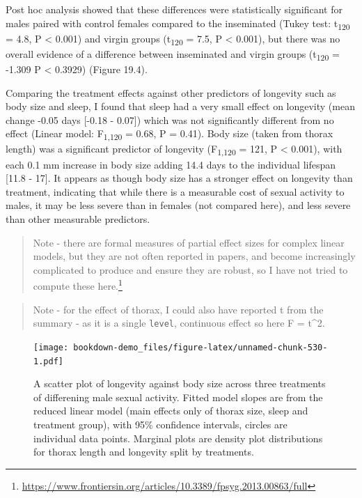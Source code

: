 \documentclass[
]{book}
\begin{document}
Post hoc analysis showed that these differences were statistically significant for males paired with control females compared to the inseminated (Tukey test: t\textsubscript{120} = 4.8, P \textless{} 0.001) and virgin groups (t\textsubscript{120} = 7.5, P \textless{} 0.001), but there was no overall evidence of a difference between inseminated and virgin groups (t\textsubscript{120} = -1.309 P \textless{} 0.3929) (Figure 19.4).

Comparing the treatment effects against other predictors of longevity such as body size and sleep, I found that sleep had a very small effect on longevity (mean change -0.05 days {[}-0.18 - 0.07{]}) which was not significantly different from no effect (Linear model: F\textsubscript{1,120} = 0.68, P = 0.41). Body size (taken from thorax length) was a significant predictor of longevity (F\textsubscript{1,120} = 121, P \textless{} 0.001), with each 0.1 mm increase in body size adding 14.4 days to the individual lifespan {[}11.8 - 17{]}. It appears as though body size has a stronger effect on longevity than treatment, indicating that while there is a measurable cost of sexual activity to males, it may be less severe than in females (not compared here), and less severe than other measurable predictors.

\begin{quote}
Note - there are formal measures of partial effect sizes for complex linear models, but they are not often reported in papers, and become increasingly complicated to produce and ensure they are robust, so I have not tried to compute these here.\footnote{\url{https://www.frontiersin.org/articles/10.3389/fpsyg.2013.00863/full}}
\end{quote}

\begin{quote}
Note - for the effect of thorax, I could also have reported t from the summary - as it is a single \texttt{level}, continuous effect so here F = t\^{}2.
\end{quote}

\begin{figure}
\centering
\texttt{[image: bookdown-demo\_files/figure-latex/unnamed-chunk-530-1.pdf]}
\caption{\label{fig:unnamed-chunk-530} A scatter plot of longevity against body size across three treatments of differening male sexual activity. Fitted model slopes are from the reduced linear model (main effects only of thorax size, sleep and treatment group), with 95\% confidence intervals, circles are individual data points. Marginal plots are density plot distributions for thorax length and longevity split by treatments.}
\end{figure}
\end{document}
